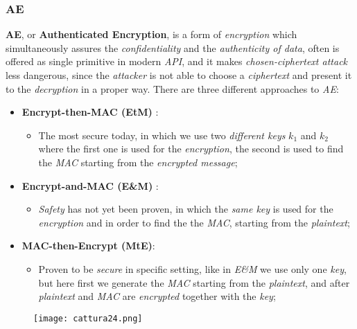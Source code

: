 \documentclass{article}
\begin{document}
\subsubsection{AE}
\textbf{AE}, or \textbf{Authenticated Encryption}, is a form of \emph{encryption} which simultaneously assures the \emph{confidentiality} and the \emph{authenticity of data}, often is offered as single primitive in modern \emph{API}, and it makes \emph{chosen-ciphertext attack} less dangerous, since the \emph{attacker} is not able to choose a \emph{ciphertext} and present it to the \emph{decryption} in a proper way. There are three different approaches to \emph{AE}:
\begin{itemize}
\item \textbf{Encrypt-then-MAC (EtM) }:
\begin{itemize}
\item The most secure today, in which we use two \emph{different keys} $k_1$ and $k_2$ where the first one is used for the \emph{encryption}, the second is used to find the \emph{MAC} starting from the \emph{encrypted message};
\end{itemize}
\item \textbf{Encrypt-and-MAC (E\&M) }:
\begin{itemize}
\item \emph{Safety} has not yet been proven, in which the\emph{ same key} is used for the \emph{encryption} and in order to find the the \emph{MAC}, starting from the \emph{plaintext};  
\end{itemize}
\item \textbf{MAC-then-Encrypt (MtE)}:
\begin{itemize}
\item Proven to be \emph{secure} in specific setting, like in\emph{ E\&M }we use only one \emph{key}, but here first we generate the \emph{MAC} starting from the \emph{plaintext}, and after \emph{plaintext} and \emph{MAC} are \emph{encrypted} together with the \emph{key};
\end{itemize}
\end{itemize}
\begin{figure}[H]
  \centering
  \texttt{[image: cattura24.png]}
\end{figure}
\clearpage
\end{document}
